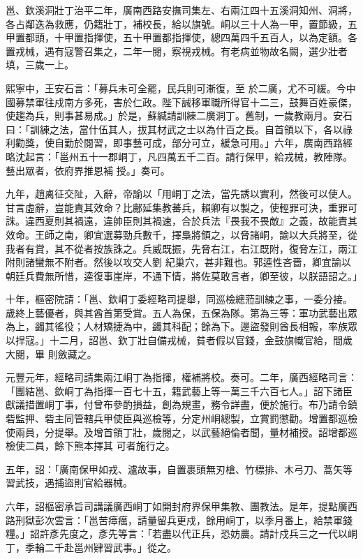 \begin{pinyinscope}
 邕、欽溪洞壯丁治平二年，廣南西路安撫司集左、右兩江四十五溪洞知州、洞將，各占鄰迭為救應，仍籍壯丁，補校長，給以旗號。峒以三十人為一甲，置節級，五甲置都頭，十甲置指揮使，五十甲置都指揮使，總四萬四千五百人，以為定額。各置戎械，遇有寇警召集之，二年一閱，察視戎械。有老病並物故名闕，選少壯者填，三歲一上。



 熙寧中，王安石言：「募兵未可全罷，民兵則可漸復，至
 於二廣，尤不可緩。今中國募禁軍往戍南方多死，害於仁政。陛下誠移軍職所得官十二三，鼓舞百姓豪傑，使趨為兵，則事甚易成。」於是，蘇緘請訓練二廣洞丁。舊制，一歲教兩月。安石曰：「訓練之法，當什伍其人，拔其材武之士以為什百之長。自首領以下，各以祿利勸獎，使自勤於閱習，即事藝可成，部分可立，緩急可用。」六年，廣南西路經略沈起言：「邕州五十一郡峒丁，凡四萬五千二百。請行保甲，給戎械，教陣隊。藝出眾者，依府界推恩補
 授。」奏可。



 九年，趙禼征交阯，入辭，帝諭以「用峒丁之法，當先誘以實利，然後可以使人。甘言虛辭，豈能責其效命？比鄜延集教蕃兵，賴卿有以製之，使輕罪可決，重罪可誅。違西夏則其禍遠，違帥臣則其禍速，合於兵法『畏我不畏敵』之義，故能責其效命。王師之南，卿宜選募勁兵數千，擇梟將領之，以脅諸峒，諭以大兵將至，從我者有賞，其不從者按族誅之。兵威既振，先脅右江，右江既附，復脅左江，兩江附則諸蠻無不附者。然後以攻交人劉
 紀巢穴，甚非難也。郭逵性吝嗇，卿宜諭以朝廷兵費無所惜，逵復事崖岸，不通下情，將佐莫敢言者，卿至彼，以朕語詔之。」



 十年，樞密院請：「邕、欽峒丁委經略司提舉，同巡檢總蒞訓練之事，一委分接。歲終上藝優者，與其酋首第受賞。五人為保，五保為隊。第為三等：軍功武藝出眾為上，蠲其徭役；人材矯捷為中，蠲其科配；餘為下。邊盜發則酋長相報，率族眾以捍寇。」十二月，詔邕、欽丁壯自備戎械，貧者假以官錢，金鼓旗幟官給，間歲大閱，畢
 則斂藏之。



 元豐元年，經略司請集兩江峒丁為指揮，權補將校。奏可。二年，廣西經略司言：「團結邕、欽峒丁為指揮一百七十五，籍武藝上等一萬三千六百七人。」詔下諸臣獻議措置峒丁事，付曾布參酌損益，創為規畫，務令詳盡，便於施行。布乃請令鎮砦監押、砦主同管轄兵甲使臣與巡檢等，分定州峒總製，立賞罰懲勸。增置都巡檢使兩員，分提舉。及增首領丁壯，歲閱之，以武藝絕倫者聞，量材補授。詔增都巡檢使二員，餘下熊本擇其
 可者施行之。



 五年，詔：「廣南保甲如戎、瀘故事，自置裹頭無刃槍、竹標排、木弓刀、蒿矢等習武技，遇捕盜則官給器械。



 六年，詔樞密承旨司講議廣西峒丁如開封府界保甲集教、團教法。是年，提點廣西路刑獄彭次雲言：「邕苦瘴癘，請量留兵更戍，餘用峒丁，以季月番上，給禁軍錢糧。」詔許彥先度之，彥先等言：「若盡以代正兵，恐妨農。請計戍兵三之一代以峒丁，季輪二千赴邕州肄習武事。」從之。




\end{pinyinscope}
